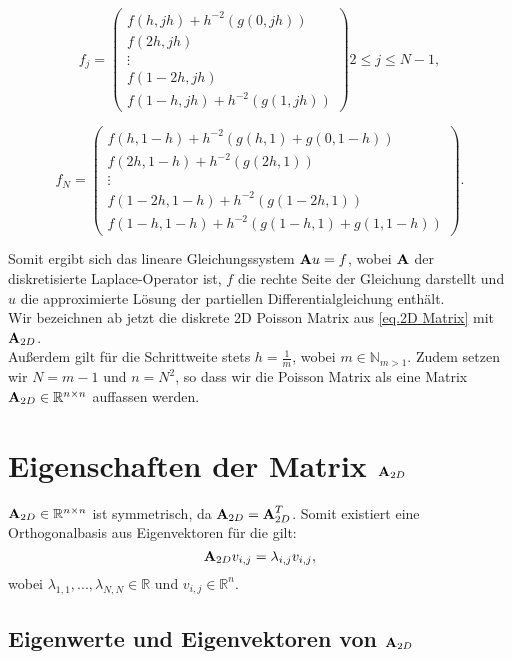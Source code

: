 \begin{equation}
f_{j} = 
\begin{pmatrix}
f(h,jh) + h^{-2}(g(0,jh)) \\
f(2h,jh) \\
\vdots \\
f(1-2h,jh) \\
f(1-h,jh) + h^{-2}(g(1,jh))
\end{pmatrix}
2 \le j \le N-1,
\end{equation}

\begin{equation}
f_{N} = 
\begin{pmatrix}
f(h,1-h) + h^{-2}(g(h,1)+g(0,1-h)) \\
f(2h,1-h) + h^{-2}(g(2h,1)) \\
\vdots \\
f(1-2h,1-h) + h^{-2}(g(1-2h,1)) \\
f(1-h,1-h) + h^{-2}(g(1-h,1)+g(1,1-h))
\end{pmatrix}.
\end{equation}

Somit ergibt sich das lineare Gleichungssystem ${\textbf{A}}u = f$, wobei ${\textbf{A}}$ der diskretisierte Laplace-Operator ist, $f$ die rechte Seite der Gleichung darstellt und $u$ die approximierte Lösung der partiellen Differentialgleichung enthält.\\
Wir bezeichnen ab jetzt die diskrete 2D Poisson Matrix aus \autoref{eq.2D Matrix} mit ${\textbf{A}}_{2D}$. \\
Außerdem gilt für die Schrittweite stets $h = \frac{1}{m}$, wobei $m \in \mathbb{N}_{m > 1}$. Zudem setzen wir $N = m-1$ und $n = N^{2}$, so dass wir die Poisson Matrix als eine Matrix ${\textbf{A}}_{2D} \in \mathbb{R}^{n \times n}$ auffassen werden.

\section{Eigenschaften der Matrix ${\textbf{A}}_{2D}$}\label{s.Eigenwerte und Eigenvektoren}

${\textbf{A}}_{2D} \in \mathbb{R}^{n \times n}$ ist symmetrisch, da ${\textbf{A}}_{2D} = {\textbf{A}}_{2D}^{T}$. Somit existiert eine Orthogonalbasis aus Eigenvektoren für die gilt:
\begin{equation}
{\textbf{A}}_{2D}v_{i,j} = \lambda_{i,j} v_{i,j},
\end{equation}
wobei $\lambda_{1,1},...,\lambda_{N,N} \in \mathbb{R}$ und $v_{i,j} \in \mathbb{R}^{n}$.

\subsection{Eigenwerte und Eigenvektoren von ${\textbf{A}}_{2D}$}\label{ss.Eigenwerte und Eigenvektoren}

